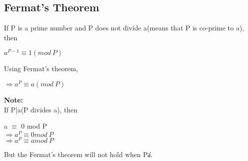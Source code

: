 \documentclass[11pt]{article}
\begin{document}
\begin{itemize}
    \subsection{Fermat's Theorem}
    If P is a prime number and P does not divide a(means that P is co-prime to a), then\\
    \begin{center}
        $a^{P-1} \equiv 1 (mod\ P)$
    \end{center}
    Using Fermat's theorem,
    \begin{center}
        $\Rightarrow a^P \equiv a (mod\ P)$
    \end{center}
    \textbf{Note:}\\
    If P|a(P divides a), then
    \begin{center}
        a $\equiv$ 0 mod P\\
        $\Rightarrow a^P \equiv 0 mod\ P$\\
        $\Rightarrow a^P \equiv a mod\ P$\\
    \end{center}
    But the Fermat's theorem will not hold when P\|a.
\end{itemize}
\end{document}
